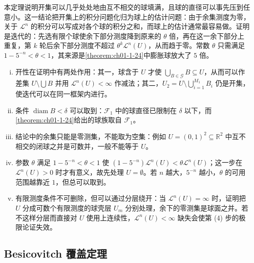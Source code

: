 \documentclass[../../main.tex]{subfiles}%
\begin{document}
\begin{remark}\label{remark:ch01-thm-1-26-动机}
本定理说明开集可以几乎处处地由互不相交的球填满，且球的直径可以事先压到任意小。这一结论把开集上的积分问题化归为球上的估计问题：由于余集测度为零，关于 $\mathcal{L}^n$ 的积分可以写成对各个球的积分之和，而球上的估计通常最容易做。证明是迭代的：先选有限个球使余下部分测度降到原来的 $\theta$ 倍，再在这一余下部分上重复，第 $k$ 轮后余下部分测度不超过 $\theta^k\mathcal{L}^n(U)$，从而趋于零。常数 $\theta$ 只需满足 $1-5^{-n}<\theta<1$，其来源是\cref{theorem:ch01-1-24}中膨胀球放大了 $5$ 倍。%
\end{remark}

\begin{remark}\label{remark:ch01-thm-1-26-条件}
\begin{enumerate}[(i)]
\item 开性在证明中有两处作用：其一，球含于 $U$ 才使 $\bigcup_{B\in\mathcal{G}}B\subseteq U$，从而可以作差集 $U\setminus\bigcup B$ 并用 $\mathcal{L}^n(U)<\infty$ 作减法；其二，$U_2=U\setminus\bigcup_{i=1}^{M_1}B_i$ 仍是开集，使迭代可以在同一框架内进行。
\item 条件 $\operatorname{diam}B<\delta$ 可以取到：$\mathcal{F}_1$ 中的球直径已限制在 $\delta$ 以下，而\cref{theorem:ch01-1-24}给出的球族取自 $\mathcal{F}_1$。%
\item 结论中的余集只能是零测集，不能取为空集：例如 $U=(0,1)^2\subseteq\mathbb{R}^2$ 中互不相交的闭球之并是可数并，一般不能等于 $U$。
\item 参数 $\theta$ 满足 $1-5^{-n}<\theta<1$ 使 $(1-5^{-n})\mathcal{L}^n(U)<\theta\mathcal{L}^n(U)$；这一步在 $\mathcal{L}^n(U)>0$ 时才有意义，故先处理 $U=\emptyset$。若 $n$ 越大，$5^{-n}$ 越小，$\theta$ 的可用范围越靠近 $1$，但总可以取到。
\item 有限测度条件不可删除，但可以通过分层绕开：当 $\mathcal{L}^n(U)=\infty$ 时，证明把 $U$ 分成可数个有限测度的球壳层 $U_m$ 分别处理，余下的零测集是球面之并。若不这样分层而直接对 $U$ 使用上连续性，$\mathcal{L}^n(U)<\infty$ 缺失会使第 (4) 步的极限论证失效。
\end{enumerate}
\end{remark}

\subsection{Besicovitch 覆盖定理}\label{subsection:ch01-05-2}
\end{document}
